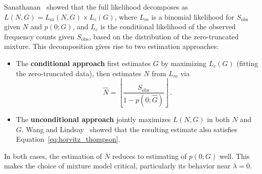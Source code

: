 ﻿\documentclass{article}
\begin{document}
Sanathanan~\cite{sanathanan1972} showed that the full likelihood decomposes as $L(N, G) = L_m(N, G) \times L_c(G)$, where $L_m$ is a binomial likelihood for $S_{\mathrm{obs}}$ given $N$ and $p(0;G)$, and $L_c$ is the conditional likelihood of the observed frequency counts given $S_{\mathrm{obs}}$, based on the distribution of the zero-truncated mixture. This decomposition gives rise to two estimation approaches:
\begin{itemize}
    \item The \textbf{conditional approach} first estimates $G$ by maximizing $L_c(G)$ (fitting the zero-truncated data), then estimates $N$ from $L_m$ via
    \begin{equation}\label{eq:horvitz_thompson}
        \hat{N} = \left\lfloor \frac{S_{\mathrm{obs}}}{1 - p(0; 
        \hat{G})} \right\rfloor\,.
    \end{equation}
    \item The \textbf{unconditional approach} jointly maximizes $L(N,G)$ in both $N$ and $G$. Wang and Lindsay~\cite{wanglindsay2005} showed that the resulting estimate also satisfies  Equation~\eqref{eq:horvitz_thompson}.
\end{itemize}
In both cases, the estimation of $N$ reduces to estimating of $p(0;G)$ well. This makes the choice of mixture model critical, particularly its behavior near $\lambda = 0$.
\end{document}
